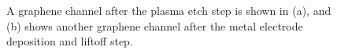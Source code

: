 \documentclass[
  a4paper,
]{scrbook}
\begin{document}
\begin{figure}
\begin{minipage}[t]{0.03\linewidth}
{\centering 


}

\end{minipage}%
%
\begin{minipage}[t]{0.01\linewidth}

{\centering 

~

}

\end{minipage}%
%
\begin{minipage}[t]{0.45\linewidth}

{\centering 


}

\end{minipage}%
%
\begin{minipage}[t]{0.01\linewidth}

{\centering 

~

}

\end{minipage}%

\caption{\label{fig-microscope-graphene-channel}A graphene channel after
the plasma etch step is shown in (a), and (b) shows another graphene
channel after the metal electrode deposition and liftoff step.}

\end{figure}
\end{document}
